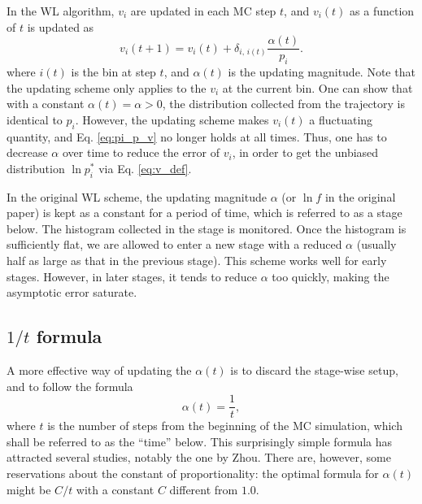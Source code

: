 \documentclass[reprint]{revtex4-1}
\begin{document}
In the WL algorithm, $v_i$ are updated
in each MC step $t$,
and $v_i(t)$ as a function of $t$
is updated as
%
\begin{equation}
  v_i(t+1)
  =
  v_i(t)
  +
  \delta_{i, \, i(t)}
  \frac{ \alpha(t) } { p_i }.
  \label{eq:wl_update}
\end{equation}
%
where $i(t)$ is the bin at step $t$,
and $\alpha(t)$ is the updating magnitude.
%
Note that the updating scheme only applies
to the $v_i$ at the current bin.
%
One can show that with a constant $\alpha(t) = \alpha > 0$,
the distribution collected from
the trajectory is identical to $p_i$.
%
However, the updating scheme
makes $v_i(t)$ a fluctuating quantity,
and Eq. \eqref{eq:pi_p_v} no longer holds
at all times.
%
Thus, one has to decrease $\alpha$ over time
to reduce the error of $v_i$,
in order to get the unbiased distribution
$\ln p_i^*$ via Eq. \eqref{eq:v_def}.





In the original WL scheme,
the updating magnitude $\alpha$ (or $\ln f$
in the original paper) is kept as a constant
for a period of time,
which is referred to as a stage below.
%
The histogram collected in the stage is monitored.
%
Once the histogram is sufficiently flat,
we are allowed to enter a new stage
with a reduced $\alpha$
(usually half as large as
that in the previous stage).
%
This scheme works well for early stages.
%
However, in later stages, it tends to reduce $\alpha$
too quickly, making the asymptotic error
saturate.



\subsection{$1/t$ formula}



A more effective way
of updating the $\alpha(t)$
is to discard the stage-wise setup,
and to follow the formula
%
\begin{equation}
  \alpha(t) = \frac{1}{t},
  \label{eq:alpha_invt}
\end{equation}
%
where $t$ is the number of steps
from the beginning of the MC simulation,
which shall be referred to as the ``time'' below.
%
This surprisingly simple formula has attracted
several studies, notably the one by Zhou.
%
There are, however, some reservations about
the constant of proportionality:
the optimal formula for $\alpha(t)$
might be $C/t$ with a constant $C$
different from $1.0$.
\end{document}
